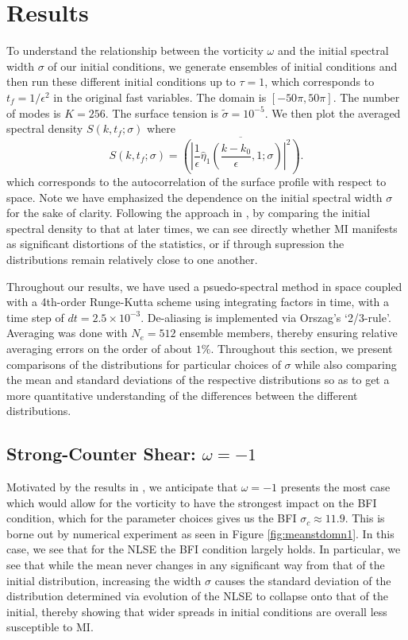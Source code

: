 \documentclass[a4paper,11pt]{article}
\begin{document}
\section*{Results}
To understand the relationship between the vorticity $\omega$ and the initial spectral width $\sigma$ of our initial conditions, we generate ensembles of initial conditions and then run these different initial conditions up to $\tau=1$, which corresponds to $t_{f} = 1/\epsilon^{2}$ in the original fast variables.  The domain is $[-50\pi,50\pi]$.  The number of modes is $K = 256$.  The surface tension is $\tilde{\sigma} = 10^{-5}$. We then plot the averaged spectral density $S(k,t_{f};\sigma)$ where 
\[
S\left(k,t_{f};\sigma\right) = \overline{\left( \left|\frac{1}{\epsilon}\hat{\eta}_{1}\left(\frac{k-k_{0}}{\epsilon},1;\sigma \right)\right|^{2}\right)}.
\]
which corresponds to the autocorrelation of the surface profile with respect to space.  Note we have emphasized the dependence on the initial spectral width $\sigma$ for the sake of clarity.  Following the approach in \cite{dysthe2,dysthe3}, by comparing the initial spectral density to that at later times, we can see directly whether MI manifests as significant distortions of the statistics, or if through supression the distributions remain relatively close to one another.  

Throughout our results, we have used a psuedo-spectral method in space coupled with a 4th-order Runge-Kutta scheme using integrating factors in time, with a time step of $dt = 2.5 \times 10^{-3}$.  De-aliasing is implemented via Orszag's `2/3-rule'.  Averaging was done with $N_{e}=512$ ensemble members, thereby ensuring relative averaging errors on the order of about $1\%$.  Throughout this section, we present comparisons of the distributions for particular choices of $\sigma$ while also comparing the mean and standard deviations of the respective distributions so as to get a more quantitative understanding of the differences between the different distributions.  

\subsection*{Strong-Counter Shear: $\omega = -1$}

Motivated by the results in \cite{curtis8}, we anticipate that $\omega=-1$ presents the most case which would allow for the vorticity to have the strongest impact on the BFI condition, which for the parameter choices gives us the BFI $\sigma_{c} \approx 11.9$.  This is borne out by numerical experiment as seen in Figure \ref{fig:meanstdomn1}.  In this case, we see that for the NLSE the BFI condition largely holds.  In particular, we see that while the mean never changes in any significant way from that of the initial distribution, increasing the width $\sigma$ causes the standard deviation of the distribution determined via evolution of the NLSE to collapse onto that of the initial, thereby showing that wider spreads in initial conditions are overall less susceptible to MI.   
\end{document}
